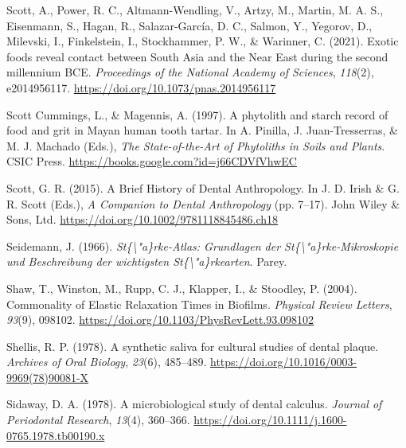 \documentclass[
  letterpaper,
]{book}
\newlength{\cslhangindent}
\newlength{\cslentryspacingunit} %
\newenvironment{CSLReferences}[2] %
 {%
  \setlength{\parindent}{0pt}
  \ifodd #1
  \let\oldpar\par
  \def\par{\hangindent=\cslhangindent\oldpar}
  \fi
  \setlength{\parskip}{#2\cslentryspacingunit}
 }%
 {}
\begin{document}
\begin{CSLReferences}{1}{0}
\leavevmode{}%
Scott, A., Power, R. C., Altmann-Wendling, V., Artzy, M., Martin, M. A.
S., Eisenmann, S., Hagan, R., Salazar-García, D. C., Salmon, Y.,
Yegorov, D., Milevski, I., Finkelstein, I., Stockhammer, P. W., \&
Warinner, C. (2021). Exotic foods reveal contact between {South Asia}
and the {Near East} during the second millennium {BCE}.
\emph{Proceedings of the National Academy of Sciences}, \emph{118}(2),
e2014956117. \url{https://doi.org/10.1073/pnas.2014956117}

\leavevmode{}%
Scott Cummings, L., \& Magennis, A. (1997). A phytolith and starch
record of food and grit in {Mayan} human tooth tartar. In A. Pinilla, J.
Juan-Tresserras, \& M. J. Machado (Eds.), \emph{The {State-of-the-Art}
of {Phytoliths} in {Soils} and {Plants}}. {CSIC Press}.
\url{https://books.google.com?id=j66CDVfVhwEC}

\leavevmode{}%
Scott, G. R. (2015). A {Brief History} of {Dental Anthropology}. In J.
D. Irish \& G. R. Scott (Eds.), \emph{A {Companion} to {Dental
Anthropology}} (pp. 7--17). {John Wiley \& Sons, Ltd}.
\url{https://doi.org/10.1002/9781118845486.ch18}

\leavevmode{}%
Seidemann, J. (1966). \emph{St\{\textbackslash"a\}rke-{Atlas}:
{Grundlagen} der {St}\{\textbackslash"a\}rke-{Mikroskopie} und
{Beschreibung} der wichtigsten {St}\{\textbackslash"a\}rkearten}.
{Parey}.

\leavevmode{}%
Shaw, T., Winston, M., Rupp, C. J., Klapper, I., \& Stoodley, P. (2004).
Commonality of {Elastic Relaxation Times} in {Biofilms}. \emph{Physical
Review Letters}, \emph{93}(9), 098102.
\url{https://doi.org/10.1103/PhysRevLett.93.098102}

\leavevmode{}%
Shellis, R. P. (1978). A synthetic saliva for cultural studies of dental
plaque. \emph{Archives of Oral Biology}, \emph{23}(6), 485--489.
\url{https://doi.org/10.1016/0003-9969(78)90081-X}

\leavevmode{}%
Sidaway, D. A. (1978). A microbiological study of dental calculus.
\emph{Journal of Periodontal Research}, \emph{13}(4), 360--366.
\url{https://doi.org/10.1111/j.1600-0765.1978.tb00190.x}


\end{CSLReferences}
\end{document}
